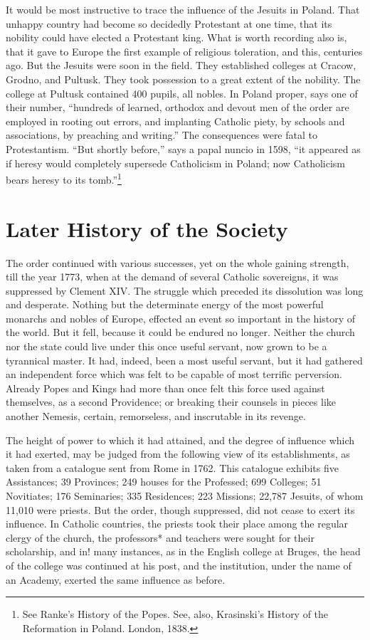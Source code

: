 \documentclass[]{book}
\let\rmarkdownfootnote\footnote%
\def\footnote{\protect\rmarkdownfootnote}
\begin{document}
It would be most instructive to trace the influence of the Jesuits in Poland. That unhappy country had become so decidedly Protestant at one time, that its nobility could have elected a Protestant king. What is worth recording also is, that it gave to Europe the first example of religious toleration, and this, centuries ago. But the Jesuits were soon in the field. They established colleges at Cracow, Grodno, and Pultusk. They took possession to a great extent of the nobility. The college at Pultusk contained 400 pupils, all nobles. In Poland proper, says one of their number, ``hundreds of learned, orthodox and devout men of the order are employed in rooting out errors, and implanting Catholic piety, by schools and associations, by preaching and writing.'' The consequences were fatal to Protestantism. ``But shortly before,'' says a papal nuncio in 1598, ``it appeared as if heresy would completely supersede Catholicism in Poland; now Catholicism bears heresy to its tomb.''\footnote{See Ranke's History of the Popes. See, also, Krasinski's History of the Reformation in Poland. London, 1838.}

\hypertarget{later-history-of-the-society}{%
\chapter{Later History of the Society}\label{later-history-of-the-society}}

The order continued with various successes, yet on the whole gaining strength, till the year 1773, when at the demand of several Catholic sovereigns, it was suppressed by Clement XIV. The struggle which preceded its dissolution was long and desperate. Nothing but the determinate energy of the most powerful monarchs and nobles of Europe, effected an event so important in the history of the world. But it fell, because it could be endured no longer. Neither the church nor the state could live under this once useful servant, now grown to be a tyrannical master. It had, indeed, been a most useful servant, but it had gathered an independent force which was felt to be capable of most terrific perversion. Already Popes and Kings had more than once felt this force used against themselves, as a second Providence; or breaking their counsels in pieces like another Nemesis, certain, remorseless, and inscrutable in its revenge.

The height of power to which it had attained, and the degree of influence which it had exerted, may be judged from the following view of its establishments, as taken from a catalogue sent from Rome in 1762. This catalogue exhibits five Assistances; 39 Provinces; 249 houses for the Professed; 699 Colleges; 51 Novitiates; 176 Seminaries; 335 Residences; 223 Missions; 22,787 Jesuits, of whom 11,010 were priests. But the order, though suppressed, did not cease to exert its influence. In Catholic countries, the priests took their place among the regular clergy of the church, the professors* and teachers were sought for their scholarship, and in! many instances, as in the English college at Bruges, the head of the college was continued at his post, and the institution, under the name of an Academy, exerted the same influence as before.
\end{document}

